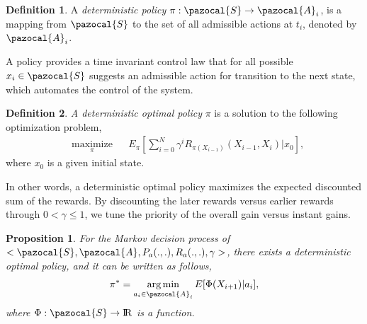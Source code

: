 \documentclass[12pt]{aastex62}
\newtheorem{prop}{Proposition}
\theoremstyle{definition}
\newtheorem{defn}{Definition}
\DeclareMathOperator*{\argmin}{arg\,min}
\begin{document}
\begin{defn}
A \textit{deterministic policy} $\pi : \pazocal{S} \rightarrow \pazocal{A}_i$, is a mapping from $\pazocal{S}$ to the set of all admissible actions at $t_i$, denoted by $\pazocal{A}_i$. 
\end{defn}
A policy provides a time invariant control law that for all possible $x_i \in \pazocal{S}$ suggests an admissible action for transition to the next state, which automates the control of the system.
\begin{defn}
\textit{A deterministic optimal policy} $\pi$ is a solution to the following optimization problem,
\begin{equation}\label{equ_opt1}
\begin{aligned}
& \underset{\pi}{\text{maximize}}
& & E_{\pi}[\sum_{i = 0}^N \gamma^i R_{\pi(X_{i-1})}(X_{i-1}, X_{i}) | x_0],
\end{aligned}
\end{equation}
where $x_0$ is a given initial state.
\end{defn}
In other words, a deterministic optimal policy maximizes the expected discounted sum of the rewards. By discounting the later rewards versus earlier rewards through $0 < \gamma \leq 1$, we tune the priority of the overall gain versus instant gains.
\begin{prop} \label{prop_main}
For the Markov decision process of $<\pazocal{S},\pazocal{A}, P_a(.,.), R_a(.,.), \gamma>$, there exists a deterministic optimal policy, and it can be written as follows, 
\begin{equation}\label{equ_opt_pol}
\pi^*= \argmin_{a_{i} \in \pazocal{A}_i} E[\Phi(X_{{i+1}}) | a_{i}],
\end{equation}
where $\Phi: \pazocal{S} \rightarrow \rm I\!R$ is a function.
\end{prop}
\end{document}
